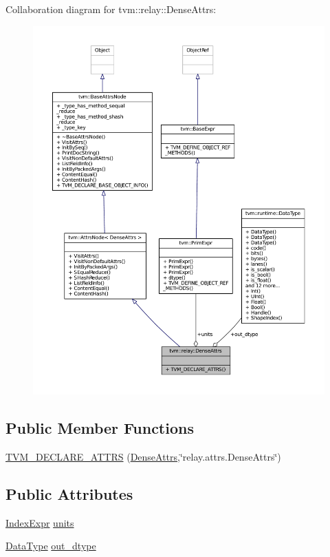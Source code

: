 Collaboration diagram for tvm\+:\+:relay\+:\+:Dense\+Attrs\+:
\nopagebreak
\begin{figure}[H]
\begin{center}
\leavevmode
\includegraphics[width=350pt]{structtvm_1_1relay_1_1DenseAttrs__coll__graph}
\end{center}
\end{figure}
\subsection*{Public Member Functions}
\begin{DoxyCompactItemize}
\item 
\hyperlink{structtvm_1_1relay_1_1DenseAttrs_ae501de65771bd58d262a27d904025147}{T\+V\+M\+\_\+\+D\+E\+C\+L\+A\+R\+E\+\_\+\+A\+T\+T\+RS} (\hyperlink{structtvm_1_1relay_1_1DenseAttrs}{Dense\+Attrs},\char`\"{}relay.\+attrs.\+Dense\+Attrs\char`\"{})
\end{DoxyCompactItemize}
\subsection*{Public Attributes}
\begin{DoxyCompactItemize}
\item 
\hyperlink{namespacetvm_1_1relay_ae153a27d81399fd266b8d598227764c4}{Index\+Expr} \hyperlink{structtvm_1_1relay_1_1DenseAttrs_a497487f7ccced8c7492a5ed03f78fa8f}{units}
\item 
\hyperlink{namespacetvm_a41918af1a1dc386388639a9d3ad06c5d}{Data\+Type} \hyperlink{structtvm_1_1relay_1_1DenseAttrs_ab3678ff125b9d928280e5bb8adda3f9a}{out\+\_\+dtype}
\end{DoxyCompactItemize}
